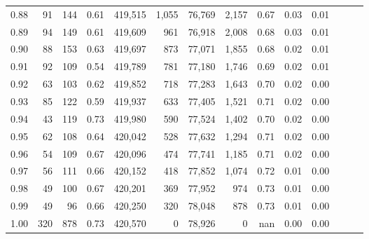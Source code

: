 \begin{tabular}{rrrrrrrrrrrrrr}
0.88 &      91 &    144 &  0.61 &  419,515 &    1,055 &  76,769 &   2,157 &  0.67 &  0.03 &      0.01 \\
0.89 &      94 &    149 &  0.61 &  419,609 &      961 &  76,918 &   2,008 &  0.68 &  0.03 &      0.01 \\
0.90 &      88 &    153 &  0.63 &  419,697 &      873 &  77,071 &   1,855 &  0.68 &  0.02 &      0.01 \\
0.91 &      92 &    109 &  0.54 &  419,789 &      781 &  77,180 &   1,746 &  0.69 &  0.02 &      0.01 \\
0.92 &      63 &    103 &  0.62 &  419,852 &      718 &  77,283 &   1,643 &  0.70 &  0.02 &      0.00 \\
0.93 &      85 &    122 &  0.59 &  419,937 &      633 &  77,405 &   1,521 &  0.71 &  0.02 &      0.00 \\
0.94 &      43 &    119 &  0.73 &  419,980 &      590 &  77,524 &   1,402 &  0.70 &  0.02 &      0.00 \\
0.95 &      62 &    108 &  0.64 &  420,042 &      528 &  77,632 &   1,294 &  0.71 &  0.02 &      0.00 \\
0.96 &      54 &    109 &  0.67 &  420,096 &      474 &  77,741 &   1,185 &  0.71 &  0.02 &      0.00 \\
0.97 &      56 &    111 &  0.66 &  420,152 &      418 &  77,852 &   1,074 &  0.72 &  0.01 &      0.00 \\
0.98 &      49 &    100 &  0.67 &  420,201 &      369 &  77,952 &     974 &  0.73 &  0.01 &      0.00 \\
0.99 &      49 &     96 &  0.66 &  420,250 &      320 &  78,048 &     878 &  0.73 &  0.01 &      0.00 \\
1.00 &     320 &    878 &  0.73 &  420,570 &        0 &  78,926 &       0 &   nan &  0.00 &      0.00 \\
\bottomrule
\end{tabular}
